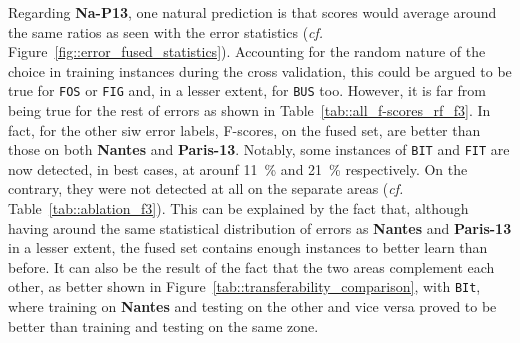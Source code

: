         Regarding \textbf{Na-P13}, one natural prediction is that scores would average around the same ratios as seen with the error statistics (\textit{cf.} Figure~\ref{fig::error_fused_statistics}).
        Accounting for the random nature of the choice in training instances during the cross validation, this could be argued to be true for \texttt{FOS} or \texttt{FIG} and, in a lesser extent, for \texttt{BUS} too.
        However, it is far from being true for the rest of errors as shown in Table~\ref{tab::all_f-scores_rf_f3}.
        In fact, for the other siw error labels, F-scores, on the fused set, are better than those on both \textbf{Nantes} and \textbf{Paris-13}.
        Notably, some instances of \texttt{BIT} and \texttt{FIT} are now detected, in best cases, at arounf \SI{11}{\percent} and \SI{21}{\percent} respectively.
        On the contrary, they were not detected at all on the separate areas (\textit{cf.} Table~\ref{tab::ablation_f3}).
        This can be explained by the fact that, although having around the same statistical distribution of errors as \textbf{Nantes} and \textbf{Paris-13} in a lesser extent, the fused set contains enough instances to better learn than before.
        It can also be the result of the fact that the two areas complement each other, as better shown in Figure~\ref{tab::transferability_comparison}, with \texttt{BIt}, where training on \textbf{Nantes} and testing on the other and vice versa proved to be better than training and testing on the same zone.\\
        
        \begin{figure}[htpb]
            \centering
        \end{figure}
    
